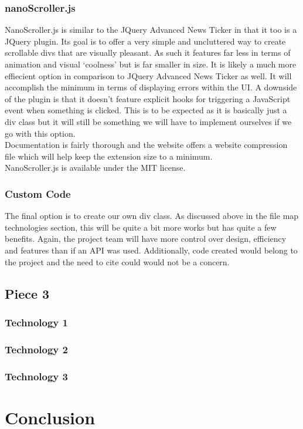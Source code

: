 \documentclass[letterpaper,10pt,titlepage,draftclsnofoot,onecolumn,onesided] {IEEEtran}
\begin{document}
\subsubsection{nanoScroller.js}
NanoScroller.js is similar to the JQuery Advanced News Ticker in that it too is a JQuery plugin. 
Its goal is to offer a very simple and uncluttered way to create scrollable divs that are visually pleasant. 
As such it features far less in terms of animation and visual ‘coolness’ but is far smaller in size. 
It is likely a much more effiecient option in comparison to JQuery Advanced News Ticker as well. 
It will accomplish the minimum in terms of displaying errors within the UI. 
A downside of the plugin is that it doesn’t feature explicit hooks for triggering a JavaScript event when something is clicked. 
This is to be expected as it is basically just a div class but it will still be something we will have to implement ourselves if we go with this option.
\\
Documentation is fairly thorough and the website offers a website compression file which will help keep the extension size to a minimum. 
\\
NanoScroller.js is available under the MIT license. 

\subsubsection{Custom Code}
The final option is to create our own div class. 
As discussed above in the file map technologies section, this will be quite a bit more works but has quite a few benefits. 
Again, the project team will have more control over design, efficiency and features than if an API was used. 
Additionally, code created would belong to the project and the need to cite could would not be a concern.
\subsection{Piece 3}
\subsubsection{Technology 1}
\subsubsection{Technology 2}
\subsubsection{Technology 3}

\section{Conclusion}



\end{document}
